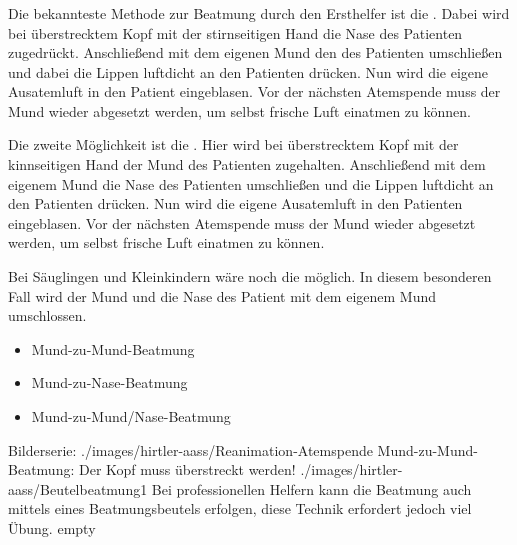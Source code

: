 \subsubsection{}

{
Die bekannteste Methode zur Beatmung durch den Ersthelfer
ist die . Dabei wird bei
überstrecktem Kopf mit der stirnseitigen Hand die Nase des
Patienten zugedrückt. Anschließend mit dem eigenen Mund den
des Patienten umschließen und dabei die Lippen luftdicht an
den Patienten drücken. Nun wird die eigene Ausatemluft in
den Patient eingeblasen. Vor der nächsten Atemspende muss
der Mund wieder abgesetzt werden, um selbst frische Luft
einatmen zu können.

Die zweite Möglichkeit ist die .
Hier wird bei überstrecktem Kopf mit der kinnseitigen Hand
der Mund des Patienten zugehalten. Anschließend mit dem
eigenem Mund die Nase des Patienten umschließen und die
Lippen luftdicht an den Patienten drücken. Nun wird die
eigene Ausatemluft in den Patienten eingeblasen. Vor der
nächsten Atemspende muss der Mund wieder abgesetzt werden,
um selbst frische Luft einatmen zu können.

Bei Säuglingen und Kleinkindern wäre noch die
 möglich. In diesem
besonderen Fall wird der Mund und die Nase des Patient mit
dem eigenem Mund umschlossen.
}{
\begin{itemize}
  \item Mund-zu-Mund-Beatmung
  \item Mund-zu-Nase-Beatmung
  \item Mund-zu-Mund/Nase-Beatmung
\end{itemize}
}{}{}{}

\begin{PictureSeries}{}{Bilderserie:
}
{./images/hirtler-aass/Reanimation-Atemspende}
{Mund-zu-Mund-Beatmung: Der Kopf muss
überstreckt werden!}
{./images/hirtler-aass/Beutelbeatmung1}
{Bei professionellen Helfern kann die Beatmung auch mittels
eines Beatmungsbeutels erfolgen, diese Technik erfordert
jedoch viel Übung.}
{empty}
{}
{}
{}
\end{PictureSeries}

